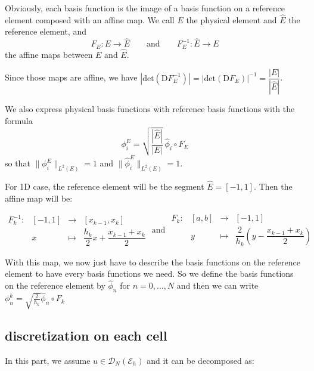 \documentclass[a4paper,10pt,draft]{article}
\begin{document}
Obviously, each basis function is the image of a basis function on a reference element composed 
with an affine map. We call $E$ the physical element and $\hat E$ the reference element, and
\begin{equation*}
 F_E : E \longrightarrow \hat E \qquad \text{and} \qquad  F_E^{-1} : \hat E \longrightarrow  E
\end{equation*}
the affine maps between $E$ and $\hat E$.

Since those maps are affine, we have $|\mathrm{det}(\mathrm{D}F_E^{-1})| = 
|\mathrm{det}(\mathrm{D}F_E)|^{-1} = \dfrac{|E|}{|\hat E|}$.

We also express physical basis functions with reference basis functions with the formula 
\begin{equation*}
 \phi_i^E = \sqrt{\dfrac{|\hat E|}{|E|}}\ \hat \phi_i \circ F_E
\end{equation*}
so that $\|\phi_i^E\|_{L^2(E)}=1$ and $\|\hat \phi_i^E\|_{L^2(E)}=1$.

For 1D case, the reference element will be the segment $\hat E = [-1,1]$. Then 
the affine map will be:

\begin{equation*}
\begin{array}{cccc}
 F_k^{-1} : & [-1,1] & \longrightarrow & [x_{k-1},x_k] \\
            & x & \longmapsto & \dfrac{h_k}{2} x + \dfrac{x_{k-1}+x_k}{2}
\end{array}
\text{ and }
\begin{array}{cccc}
 F_k : & [a,b] & \longrightarrow & [-1,1] \\
            & y & \longmapsto & \dfrac{2}{h_k} \left(y - \dfrac{x_{k-1}+x_k}{2}\right)
\end{array}
\end{equation*}

 With this map, we now just have to describe the basis functions on the reference element to have 
every basis functions we need. So we define the basis functions on the reference element by $\hat 
\phi_n$ for $n= 0, \dots , N$ and then we can write $\phi_n^k = \sqrt{\frac{2}{h_k}} \hat 
\phi_n \circ F_k$

\subsection{discretization on each cell}

In this part, we assume $u \in \mathcal{D}_N(\mathcal{E}_h)$ and it can be decomposed as:
\end{document}

